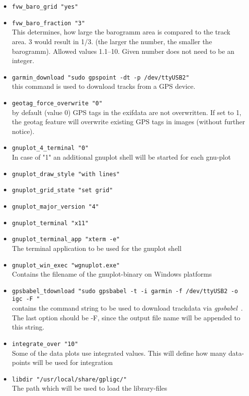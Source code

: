 \begin{itemize}
\item \texttt{fvw\_baro\_grid    "yes"}

\item \texttt{fvw\_baro\_fraction "3"}\\
This determines, how large the barogramm area is compared to the track area.
3 would result in 1/3. (the larger the number, the smaller the barogramm). Allowed values 1.1--10.
Given number does not need to be an integer.

\item \texttt{garmin\_download    "sudo gpspoint -dt -p /dev/ttyUSB2"} \\
this command is used to download tracks from a GPS device.

\item \texttt{geotag\_force\_overwrite    "0"} \\
  by default (value 0) GPS tags in the exifdata are not overwritten. If set to 1, the geotag feature will
overwrite existing GPS tags in images (without further notice).

\item \texttt{gnuplot\_4\_terminal    "0"} \\
 In case of "1" an additional gnuplot shell will be started for each gnu-plot
\item \texttt{gnuplot\_draw\_style    "with lines"}
\item \texttt{gnuplot\_grid\_state    "set grid"}
\item \texttt{gnuplot\_major\_version    "4"}
\item \texttt{gnuplot\_terminal    "x11"}
\item \texttt{gnuplot\_terminal\_app    "xterm -e"}\\
    The terminal application to be used for the gnuplot shell
\item \texttt{gnuplot\_win\_exec    "wgnuplot.exe"}\\
    Contains the filename of the gnuplot-binary on Windows platforms

\item \texttt{gpsbabel\_tdownload  "sudo gpsbabel -t -i garmin -f /dev/ttyUSB2 -o igc -F "}\\
  contains the command string to be used to download trackdata via \emph{gpsbabel}~\cite{gpsbabel}. The last option should be -F, since the output file name will be appended to this string.

\item \texttt{integrate\_over    "10"}\\
    Some of the data plots use integrated values. This will define how many data-points will
    be used for  integration
\item \texttt{libdir    "/usr/local/share/gpligc/"}\\
    The path which will be used to load the library-files


\end{itemize}
